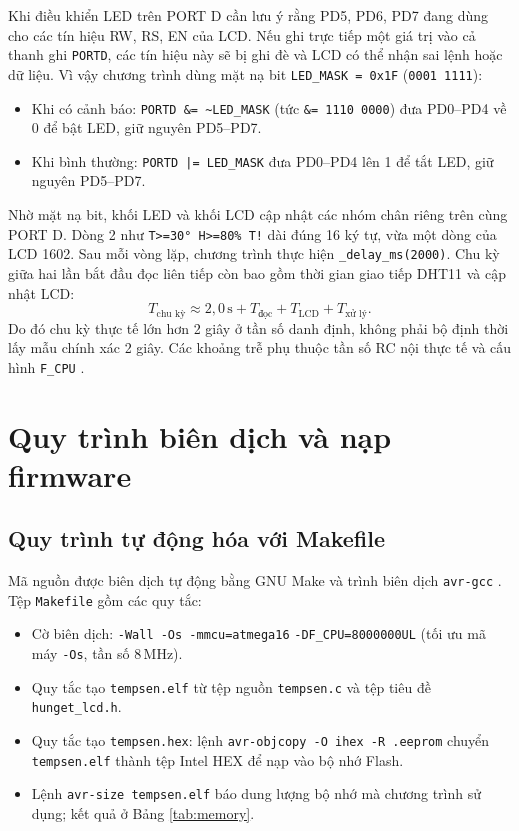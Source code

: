 Khi điều khiển LED trên PORT D cần lưu ý rằng PD5, PD6, PD7 đang dùng cho các tín hiệu RW, RS, EN của LCD. Nếu ghi trực tiếp một giá trị vào cả thanh ghi \texttt{PORTD}, các tín hiệu này sẽ bị ghi đè và LCD có thể nhận sai lệnh hoặc dữ liệu. Vì vậy chương trình dùng mặt nạ bit \texttt{LED\_MASK = 0x1F} (\texttt{0001 1111}):
\begin{itemize}[leftmargin=1.2cm]
    \item Khi có cảnh báo: \texttt{PORTD \&= \textasciitilde LED\_MASK} (tức \texttt{\&= 1110 0000}) đưa PD0--PD4 về 0 để bật LED, giữ nguyên PD5--PD7.
    \item Khi bình thường: \texttt{PORTD |= LED\_MASK} đưa PD0--PD4 lên 1 để tắt LED, giữ nguyên PD5--PD7.
\end{itemize}

Nhờ mặt nạ bit, khối LED và khối LCD cập nhật các nhóm chân riêng trên cùng PORT D. Dòng 2 như \texttt{T>=30° H>=80\% T!} dài đúng 16 ký tự, vừa một dòng của LCD 1602. Sau mỗi vòng lặp, chương trình thực hiện \texttt{\_delay\_ms(2000)}. Chu kỳ giữa hai lần bắt đầu đọc liên tiếp còn bao gồm thời gian giao tiếp DHT11 và cập nhật LCD:
\begin{equation}
T_{\text{chu kỳ}} \approx 2{,}0\,\text{s} + T_{\text{đọc}} + T_{\text{LCD}} + T_{\text{xử lý}}.
\end{equation}
Do đó chu kỳ thực tế lớn hơn 2 giây ở tần số danh định, không phải bộ định thời lấy mẫu chính xác 2 giây. Các khoảng trễ phụ thuộc tần số RC nội thực tế và cấu hình \texttt{F\_CPU} \cite{avrgcc-manual}.

\section{Quy trình biên dịch và nạp firmware}

\subsection{Quy trình tự động hóa với Makefile}
\label{sec:makefile}

Mã nguồn được biên dịch tự động bằng GNU Make và trình biên dịch \texttt{avr-gcc} \cite{avrgcc-manual}. Tệp \texttt{Makefile} gồm các quy tắc:
\begin{itemize}[leftmargin=1.2cm]
    \item Cờ biên dịch: \texttt{-Wall -Os -mmcu=atmega16} \texttt{-DF\_CPU=8000000UL} (tối ưu mã máy \texttt{-Os}, tần số 8\,MHz).
    \item Quy tắc tạo \texttt{tempsen.elf} từ tệp nguồn \texttt{tempsen.c} và tệp tiêu đề \texttt{hunget\_lcd.h}.
    \item Quy tắc tạo \texttt{tempsen.hex}: lệnh \texttt{avr-objcopy -O ihex -R .eeprom} chuyển \texttt{tempsen.elf} thành tệp Intel HEX để nạp vào bộ nhớ Flash.
    \item Lệnh \texttt{avr-size tempsen.elf} báo dung lượng bộ nhớ mà chương trình sử dụng; kết quả ở Bảng \ref{tab:memory}.
\end{itemize}

